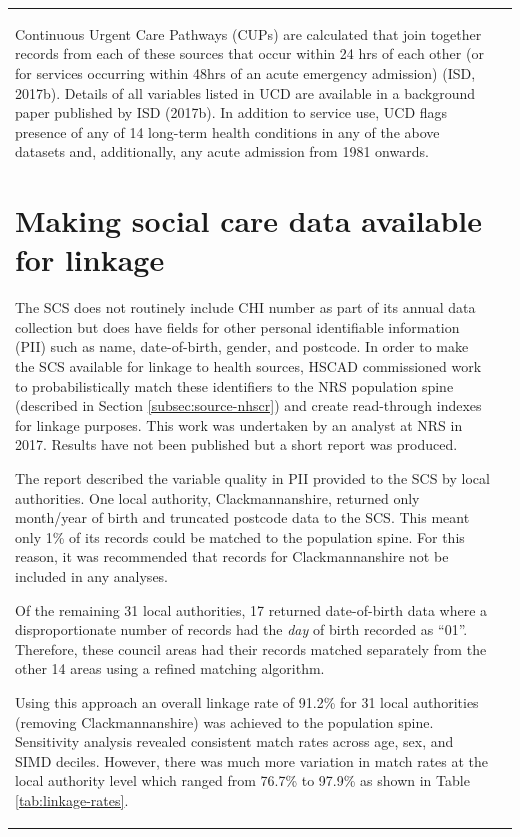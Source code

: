 \documentclass[12pt,a4paper,oneside,table]{report}
\begin{document}
\begin{tabular}[t]{ll}
Continuous Urgent Care Pathways (CUPs) are calculated that join together
records from each of these sources that occur within 24 hrs of each
other (or for services occurring within 48hrs of an acute emergency
admission) (ISD, 2017b). Details of all variables listed in UCD are
available in a background paper published by ISD (2017b). In addition to
service use, UCD flags presence of any of 14 long-term health conditions
in any of the above datasets and, additionally, any acute admission from
1981 onwards.

\section{Making social care data available for linkage}\label{sec:linkage}

The SCS does not routinely include CHI number as part of its annual data
collection but does have fields for other personal identifiable
information (PII) such as name, date-of-birth, gender, and postcode. In
order to make the SCS available for linkage to health sources, HSCAD
commissioned work to probabilistically match these identifiers to the
NRS population spine (described in Section \ref{subsec:source-nhscr})
and create read-through indexes for linkage purposes. This work was
undertaken by an analyst at NRS in 2017. Results have not been published
but a short report was produced.

The report described the variable quality in PII provided to the SCS by
local authorities. One local authority, Clackmannanshire, returned only
month/year of birth and truncated postcode data to the SCS. This meant
only 1\% of its records could be matched to the population spine. For
this reason, it was recommended that records for Clackmannanshire not be
included in any analyses.

Of the remaining 31 local authorities, 17 returned date-of-birth data
where a disproportionate number of records had the \emph{day} of birth
recorded as ``01''. Therefore, these council areas had their records
matched separately from the other 14 areas using a refined matching
algorithm.

Using this approach an overall linkage rate of 91.2\% for 31 local
authorities (removing Clackmannanshire) was achieved to the population
spine. Sensitivity analysis revealed consistent match rates across age,
sex, and SIMD deciles. However, there was much more variation in match
rates at the local authority level which ranged from 76.7\% to 97.9\% as
shown in Table \ref{tab:linkage-rates}.


\end{tabular}
\end{document}
